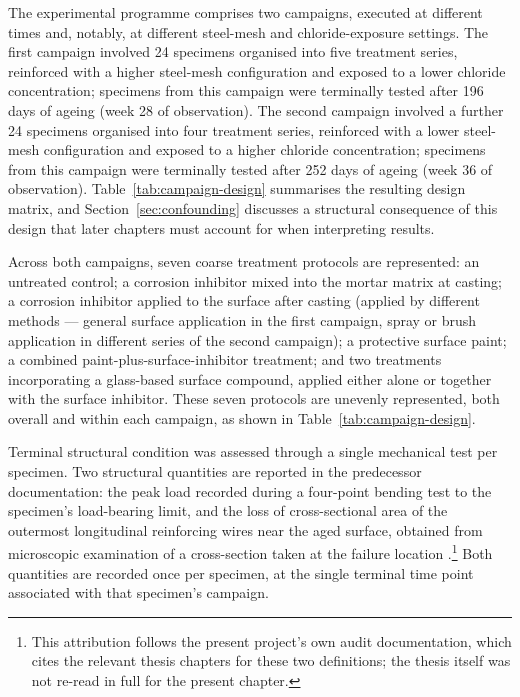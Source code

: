 The experimental programme comprises two campaigns, executed at different
times and, notably, at different steel-mesh and chloride-exposure settings.
The first campaign involved 24 specimens organised into five treatment
series, reinforced with a higher steel-mesh configuration and exposed to a
lower chloride concentration; specimens from this campaign were
terminally tested after 196 days of ageing (week 28 of observation). The
second campaign involved a further 24 specimens organised into four
treatment series, reinforced with a lower steel-mesh configuration and
exposed to a higher chloride concentration; specimens from this campaign
were terminally tested after 252 days of ageing (week 36 of observation).
Table~\ref{tab:campaign-design} summarises the resulting design matrix, and
Section~\ref{sec:confounding} discusses a structural consequence of this
design that later chapters must account for when interpreting results.

Across both campaigns, seven coarse treatment protocols are represented: an
untreated control; a corrosion inhibitor mixed into the mortar matrix at
casting; a corrosion inhibitor applied to the surface after casting
(applied by different methods — general surface application in the first
campaign, spray or brush application in different series of the second
campaign); a protective surface paint; a combined paint-plus-surface-inhibitor
treatment; and two treatments incorporating a glass-based surface compound,
applied either alone or together with the surface inhibitor. These seven
protocols are unevenly represented, both overall and within each campaign,
as shown in Table~\ref{tab:campaign-design}.

Terminal structural condition was assessed through a single mechanical test
per specimen. Two structural quantities are reported in the predecessor
documentation: the peak load recorded during a four-point bending test to
the specimen's load-bearing limit, and the loss of cross-sectional area of
the outermost longitudinal reinforcing wires near the aged surface,
obtained from microscopic examination of a cross-section taken at the
failure location \citep{hossain_thesis}.\footnote{This attribution follows
the present project's own audit documentation, which cites the relevant
thesis chapters for these two definitions; the thesis itself was not
re-read in full for the present chapter.}
Both quantities are recorded once per specimen, at the single terminal time
point associated with that specimen's campaign.

